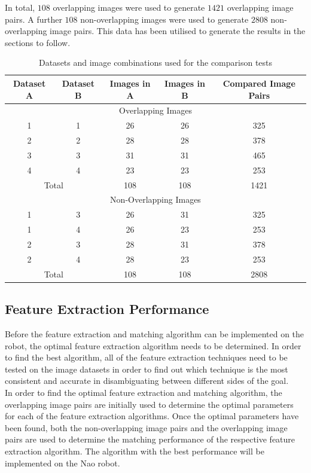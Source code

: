 \documentclass{article}
\begin{document}
In total, $108$ overlapping images were used to generate $1421$ overlapping image pairs. A further $108$ non-overlapping images were used to generate $2808$ non-overlapping image pairs. This data has been utilised to generate the results in the sections to follow. \\ 

\begin{table}
\caption{Datasets and image combinations used for the comparison tests}
\begin{tabular}{|c|c|c|c|c|}
\hline 
Dataset A & Dataset B & Images in A & Images in B & Compared Image Pairs\tabularnewline
\hline 
\hline 
\multicolumn{5}{|c}{Overlapping Images}\tabularnewline
\hline 
1 & 1 & 26 & 26 & 325\tabularnewline
\hline 
2 & 2 & 28 & 28 & 378\tabularnewline
\hline 
3 & 3 & 31 & 31 & 465\tabularnewline
\hline 
4 & 4 & 23 & 23 & 253\tabularnewline
\hline 
\multicolumn{2}{|c|}{Total} & 108 & 108 & 1421\tabularnewline
\hline 
\multicolumn{5}{|c}{Non-Overlapping Images}\tabularnewline
\hline 
1 & 3 & 26 & 31 & 325\tabularnewline
\hline 
1 & 4 & 26 & 23 & 253\tabularnewline
\hline 
2 & 3 & 28 & 31 & 378\tabularnewline
\hline 
2 & 4 & 28 & 23 & 253\tabularnewline
\hline 
\multicolumn{2}{|c|}{Total} & 108 & 108 & 2808\tabularnewline
\hline 
\end{tabular}
\label{table:overlap}
\end{table}

\subsection{Feature Extraction Performance}
\label{sec:featureExtraction}
Before the feature extraction and matching algorithm can be implemented on the robot, the optimal feature extraction algorithm needs to be determined. In order to find the best algorithm, all of the feature extraction techniques need to be tested on the image datasets in order to find out which technique is the most consistent and accurate in disambiguating between different sides of the goal. \\

In order to find the optimal feature extraction and matching algorithm, the overlapping image pairs are initially used to determine the optimal parameters for each of the feature extraction algorithms. Once the optimal parameters have been found, both the non-overlapping image pairs and the overlapping image pairs are used to determine the matching performance of the respective feature extraction algorithm. The algorithm with the best performance will be implemented on the Nao robot.\\
\end{document}
